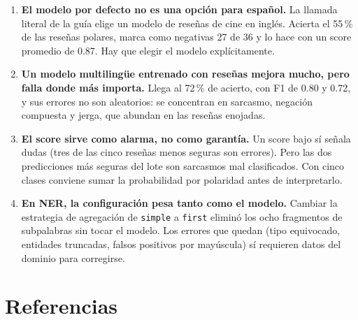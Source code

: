 \documentclass[12pt,a4paper]{article}
\begin{document}
\begin{enumerate}[leftmargin=1.4em]
\item \textbf{El modelo por defecto no es una opción para español.} La llamada literal de la guía
elige un modelo de reseñas de cine en inglés. Acierta el 55\,\% de las reseñas polares, marca como
negativas 27 de 36 y lo hace con un score promedio de 0.87. Hay que elegir el modelo explícitamente.

\item \textbf{Un modelo multilingüe entrenado con reseñas mejora mucho, pero falla donde más
importa.} Llega al 72\,\% de acierto, con F1 de 0.80 y 0.72, y sus errores no son aleatorios: se
concentran en sarcasmo, negación compuesta y jerga, que abundan en las reseñas enojadas.

\item \textbf{El score sirve como alarma, no como garantía.} Un score bajo sí señala dudas (tres de
las cinco reseñas menos seguras son errores). Pero las dos predicciones más seguras del lote son
sarcasmos mal clasificados. Con cinco clases conviene sumar la probabilidad por polaridad antes de
interpretarlo.

\item \textbf{En NER, la configuración pesa tanto como el modelo.} Cambiar la estrategia de
agregación de \texttt{simple} a \texttt{first} eliminó los ocho fragmentos de subpalabras sin
tocar el modelo. Los errores que quedan (tipo equivocado, entidades truncadas,
falsos positivos por mayúscula) sí requieren datos del dominio para corregirse.
\end{enumerate}

\section{Referencias}
\end{document}
